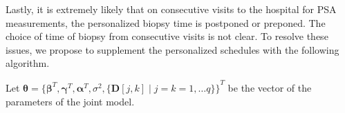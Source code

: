 Lastly, it is extremely likely that on consecutive visits to the hospital for PSA measurements, the personalized biopsy time is postponed or preponed. The choice of time of biopsy from consecutive visits is not clear. To resolve these issues, we propose to supplement the personalized schedules with the following algorithm.


Let $\boldsymbol{\theta} = {\{\boldsymbol{\beta}^T, \boldsymbol{\gamma}^T, \boldsymbol{\alpha}^T, \sigma^2, \{\boldsymbol{D}[j,k] \mid j=k=1, \ldots q\}\}}^T$ be the vector of the parameters of the joint model.
